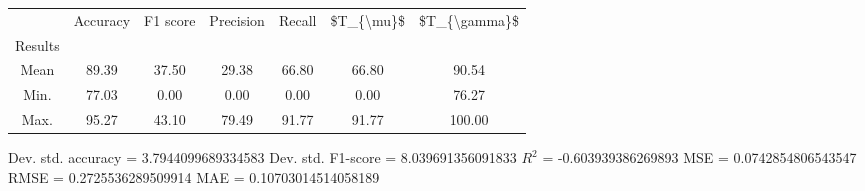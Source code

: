 \begin{tabular}{|c|c|c|c|c|c|c|}
\toprule
{} &  Accuracy &  F1 score &  Precision &  Recall &  \$T\_\{\textbackslash mu\}\$ &  \$T\_\{\textbackslash gamma\}\$ \\
Results &           &           &            &         &            &               \\
\hline
Mean    &     89.39 &     37.50 &      29.38 &   66.80 &      66.80 &         90.54 \\
Min.    &     77.03 &      0.00 &       0.00 &    0.00 &       0.00 &         76.27 \\
Max.    &     95.27 &     43.10 &      79.49 &   91.77 &      91.77 &        100.00 \\
\bottomrule
\end{tabular}

 Dev. std. accuracy = 3.7944099689334583
 Dev. std. F1-score = 8.039691356091833
 $R^2$ = -0.603939386269893
 MSE = 0.0742854806543547
 RMSE = 0.2725536289509914
 MAE = 0.10703014514058189